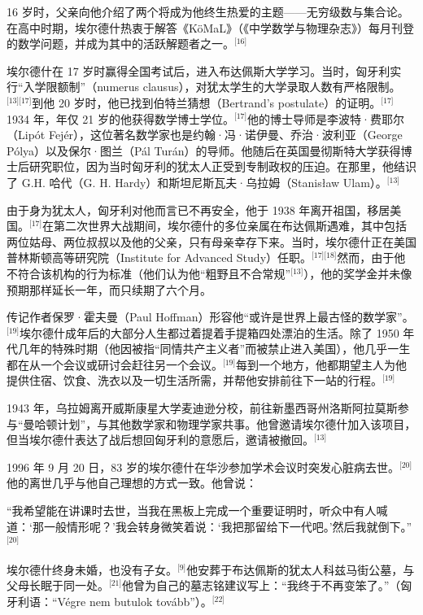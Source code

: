 16 岁时，父亲向他介绍了两个将成为他终生热爱的主题——无穷级数与集合论。在高中时期，埃尔德什热衷于解答《KöMaL》（《中学数学与物理杂志》）每月刊登的数学问题，并成为其中的活跃解题者之一。\(^\text{[16]}\)

埃尔德什在 17 岁时赢得全国考试后，进入布达佩斯大学学习。当时，匈牙利实行“入学限额制”（numerus clausus），对犹太学生的大学录取人数有严格限制。\(^\text{[13][17]}\)到他 20 岁时，他已找到伯特兰猜想（Bertrand’s postulate）的证明。\(^\text{[17]}\)1934 年，年仅 21 岁的他获得数学博士学位。\(^\text{[17]}\)他的博士导师是李波特·费耶尔（Lipót Fejér），这位著名数学家也是约翰·冯·诺伊曼、乔治·波利亚（George Pólya）以及保尔·图兰（Pál Turán）的导师。他随后在英国曼彻斯特大学获得博士后研究职位，因为当时匈牙利的犹太人正受到专制政权的压迫。在那里，他结识了 G.H. 哈代（G. H. Hardy）和斯坦尼斯瓦夫·乌拉姆（Stanisław Ulam）。\(^\text{[13]}\)

由于身为犹太人，匈牙利对他而言已不再安全，他于 1938 年离开祖国，移居美国。\(^\text{[17]}\)在第二次世界大战期间，埃尔德什的多位亲属在布达佩斯遇难，其中包括两位姑母、两位叔叔以及他的父亲，只有母亲幸存下来。当时，埃尔德什正在美国普林斯顿高等研究院（Institute for Advanced Study）任职。\(^\text{[17][18]}\)然而，由于他不符合该机构的行为标准（他们认为他“粗野且不合常规”\(^\text{[13]}\)），他的奖学金并未像预期那样延长一年，而只续期了六个月。

传记作者保罗·霍夫曼（Paul Hoffman）形容他“或许是世界上最古怪的数学家”。\(^\text{[19]}\)埃尔德什成年后的大部分人生都过着提着手提箱四处漂泊的生活。除了 1950 年代几年的特殊时期（他因被指“同情共产主义者”而被禁止进入美国），他几乎一生都在从一个会议或研讨会赶往另一个会议。\(^\text{[19]}\)每到一个地方，他都期望主人为他提供住宿、饮食、洗衣以及一切生活所需，并帮他安排前往下一站的行程。\(^\text{[19]}\)

1943 年，乌拉姆离开威斯康星大学麦迪逊分校，前往新墨西哥州洛斯阿拉莫斯参与“曼哈顿计划”，与其他数学家和物理学家共事。他曾邀请埃尔德什加入该项目，但当埃尔德什表达了战后想回匈牙利的意愿后，邀请被撤回。\(^\text{[13]}\)

1996 年 9 月 20 日，83 岁的埃尔德什在华沙参加学术会议时突发心脏病去世。\(^\text{[20]}\)他的离世几乎与他自己理想的方式一致。他曾说：

“我希望能在讲课时去世，当我在黑板上完成一个重要证明时，听众中有人喊道：‘那一般情形呢？’我会转身微笑着说：‘我把那留给下一代吧。’然后我就倒下。”\(^\text{[20]}\)

埃尔德什终身未婚，也没有子女。\(^\text{[9]}\)他安葬于布达佩斯的犹太人科兹马街公墓，与父母长眠于同一处。\(^\text{[21]}\)他曾为自己的墓志铭建议写上：“我终于不再变笨了。”（匈牙利语：“Végre nem butulok tovább”）。\(^\text{[22]}\)

